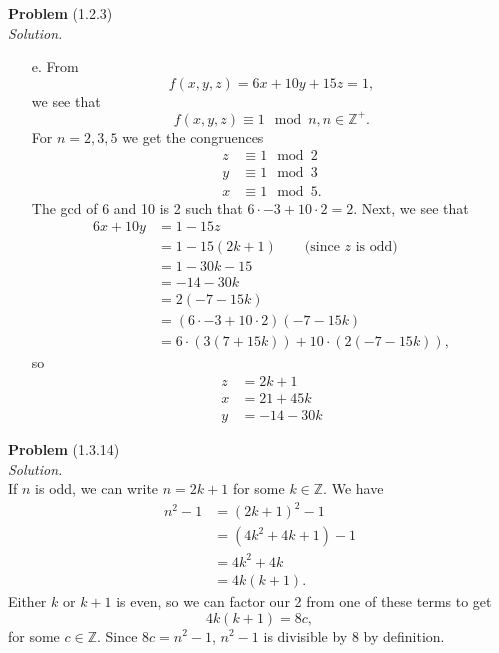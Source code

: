 \documentclass[12 pt]{amsart}
\begin{document}
\phantom{\quad} \vfill
\noindent
\textbf{Problem} (1.2.3) \\[4ex]
\emph{Solution.} \\[2ex]
	\begin{enumerate}
		\item[e.]
      From
      \[
        f(x,y,z) = 6 x + 10 y + 15 z = 1,
      \]
      we see that
      \[
        f(x,y,z) \equiv 1 \mod n, n \in \mathbb{Z}^+.
      \]
      For $n = 2, 3, 5$ we get the congruences
      \begin{align*}
        z &\equiv 1 \mod 2 \\
        y &\equiv 1 \mod 3 \\
        x &\equiv 1 \mod 5.
      \end{align*}
      The gcd of 6 and 10 is 2 such that $6 \cdot -3 + 10 \cdot 2 = 2$.
      Next, we see that
      \begin{align*}
        6x + 10 y &= 1 - 15 z \\
                  &= 1 - 15 (2k + 1) \qquad \text{(since $z$ is odd)} \\
          &= 1 - 30k - 15 \\
          &= -14 - 30k \\
          &= 2 ( -7 - 15k) \\
          &= (6 \cdot -3 + 10 \cdot 2)(-7 - 15k) \\
          &= 6 \cdot (3(7+15k)) + 10 \cdot (2(-7 - 15k)),
      \end{align*}
      so
      \begin{align*}
        z &= 2k + 1\\
        x &= 21 + 45k \\
        y &= -14 - 30k  
      \end{align*}
	\end{enumerate}
\vfill
\newpage



\phantom{\quad} \vfill
\noindent
\textbf{Problem} (1.3.14) \\[4ex]
\emph{Solution.} \\[2ex]
  If $n$ is odd, we can write $n = 2k + 1$ for some $k \in \mathbb{Z}$. 
  We have
  \begin{align*}
    n^2 - 1 &= (2k + 1)^2 - 1 \\
      &= (4k^2 + 4k + 1) - 1 \\
      &= 4k^2 + 4k \\
      &= 4k(k + 1).
  \end{align*}
  Either $k$ or $k + 1$ is even, so we can factor our 2 from one of these
  terms to get
  \[
    4k (k + 1) = 8c,
  \]
  for some $c \in \mathbb{Z}$.
  Since $8c = n^2 -1$, $n^2 - 1$ is divisible by 8 by definition.
\vfill
\newpage
\end{document}
